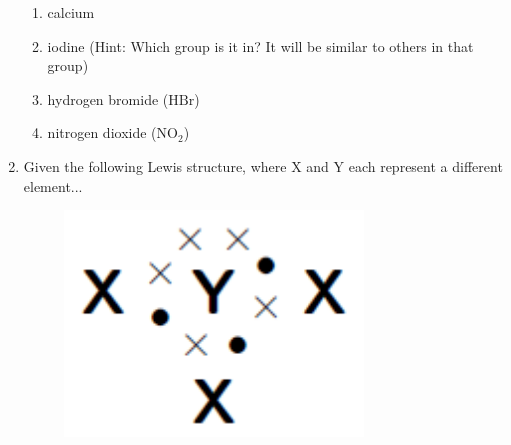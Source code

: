 \begin{enumerate}[noitemsep, label=\textbf{\arabic*}. ]
\label{m38689*id148172}\begin{enumerate}[noitemsep, label=\textbf{\alph*}. ] 
            \label{m38689*uid176}\item calcium
\label{m38689*uid177}\item iodine (Hint: Which group is it in? It will be similar to others in that group)
\label{m38689*uid178}\item hydrogen bromide (\begin{math}\mathrm{HBr}\end{math})
\label{m38689*uid179}\item nitrogen dioxide (\begin{math}\mathrm{NO}{}_{2}\end{math})
\end{enumerate}
                \label{m38689*uid180}\item Given the following Lewis structure, where X and Y each represent a different element...

    \setcounter{subfigure}{0}


	\begin{figure}[H] %
    \begin{center}
    \label{m38689*id148255!!!underscore!!!media}\label{m38689*id148255!!!underscore!!!printimage}\includegraphics[width=300px]{col11305.imgs/m38689_CG11C1_027.png} %
        
      \vspace{2pt}
    \vspace{.1in}
    
    \end{center}

 \end{figure}   


\end{enumerate}
